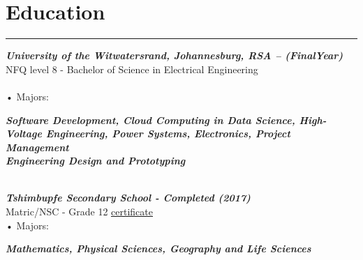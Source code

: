 \documentclass[12pt]{article}
\begin{document}
\vspace{-5mm} \section*{\fontsize{14}{1}\selectfont\color{color_29791}Education}\vspace{-10pt} 
\rule{\textwidth}{0.4pt}
\vspace{2pt}
\textbf{\textit{\fontsize{12}{1}\selectfont\color{color_29791}University of the Witwatersrand, Johannesburg, RSA – (FinalYear)}} %
\\\fontsize{11}{1}\selectfont\color{color_29791}NFQ level 8 - Bachelor of Science in Electrical Engineering\\\\
{{\fontsize{10}{1}\selectfont\color{color_29791}\hspace{10mm}• Majors:}}
\parbox{\textwidth}{\raggedright
    \textbf{\textit{\fontsize{8}{1}\selectfont\color{color_29791}Software Development, Cloud Computing in Data Science, High-Voltage Engineering, Power Systems, Electronics, Project Management \\ Engineering Design and Prototyping}}
} 
\vspace{4pt}
\\\textbf{\textit{\fontsize{12}{1}\selectfont\color{color_29791}Tshimbupfe Secondary School - Completed (2017)}}\\
\fontsize{10}{1}\selectfont\color{color_29791}Matric/NSC - Grade 12 \hspace{112mm} \href{https://drive.google.com/file/d/1i5SDy8WoBzwGOmAEAcxJzVyCb1c7Gfqq/view?usp=sharing}{\underline{certificate}}\\
{{\fontsize{10}{1}\selectfont\color{color_29791}\hspace{10mm}• Majors:}}
\parbox{\textwidth}{\raggedright
    \textbf{\textit{\fontsize{9}{1}\selectfont\color{color_29791}Mathematics, Physical Sciences, Geography and Life Sciences}}
}
\end{document}
